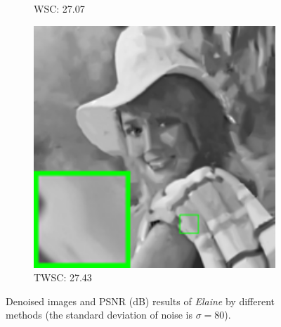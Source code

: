 \begin{figure}
\begin{adjustwidth}{-2cm}{}
\begin{subfigure}[t]{0.19\textwidth}
		\caption{WSC: 27.07}
    \end{subfigure}
    \hfill
    \begin{subfigure}[t]{0.19\textwidth}
        \centering
        \includegraphics[width=1\textwidth]{images/twsc/awgn/resize_br_WLSWSC_80_elaine.png}
		\caption{TWSC: 27.43}
    \end{subfigure}
    \caption{Denoised images and PSNR (dB) results of \textsl{Elaine} by different methods (the standard deviation of noise is $\sigma=80$).}
    \label{fig6}
\end{adjustwidth}
\end{figure}

